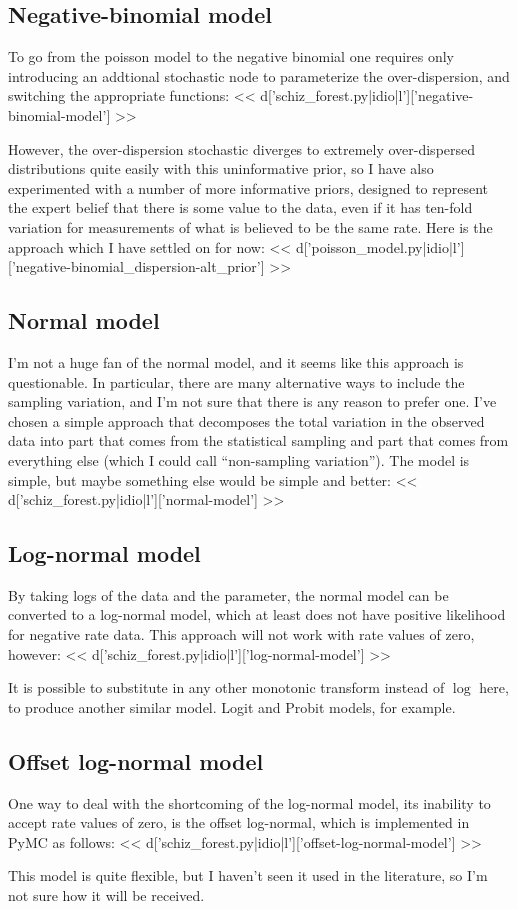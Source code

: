 \subsection{Negative-binomial model}
To go from the poisson model to the negative binomial one requires
only introducing an addtional stochastic node to parameterize the
over-dispersion, and switching the appropriate functions:
<< d['schiz_forest.py|idio|l']['negative-binomial-model'] >>

However, the over-dispersion stochastic diverges to extremely
over-dispersed distributions quite easily with this uninformative
prior, so I have also experimented with a number of more informative
priors, designed to represent the expert belief that there is some
value to the data, even if it has ten-fold variation for measurements
of what is believed to be the same rate.  Here is the approach which I
have settled on for now:
<< d['poisson_model.py|idio|l']['negative-binomial_dispersion-alt_prior'] >>

\subsection{Normal model}
I'm not a huge fan of the normal model, and it seems like this
approach is questionable.  In particular, there are many alternative
ways to include the sampling variation, and I'm not sure that there is
any reason to prefer one.  I've chosen a simple approach that
decomposes the total variation in the observed data into part that
comes from the statistical sampling and part that comes from
everything else (which I could call ``non-sampling variation'').  The
model is simple, but maybe something else would be simple and better:
<< d['schiz_forest.py|idio|l']['normal-model'] >>



\subsection{Log-normal model}
By taking logs of the data and the parameter, the normal model can be
converted to a log-normal model, which at least does not have positive
likelihood for negative rate data.  This approach will not work with
rate values of zero, however:
<< d['schiz_forest.py|idio|l']['log-normal-model'] >>

It is possible to substitute in any other monotonic transform instead
of $\log$ here, to produce another similar model.  Logit and Probit
models, for example.



\subsection{Offset log-normal model}
One way to deal with the shortcoming of the log-normal model, its
inability to accept rate values of zero, is the offset log-normal,
which is implemented in PyMC as follows:
<< d['schiz_forest.py|idio|l']['offset-log-normal-model'] >>

This model is quite flexible, but I haven't seen it used in the
literature, so I'm not sure how it will be received.

